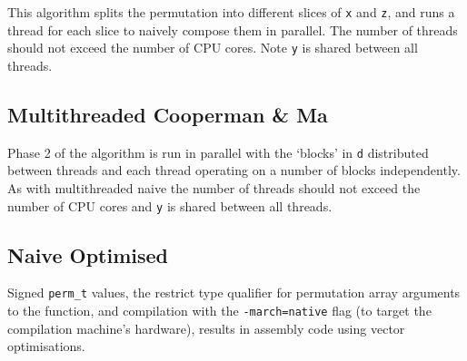 \documentclass{article}
\begin{document}

This algorithm splits the permutation into different slices of \texttt{x} and \texttt{z}, and runs a thread for each slice to naively compose them in parallel. The number of threads should not exceed the number of CPU cores. Note \texttt{y} is shared between all threads.

\subsection{Multithreaded Cooperman \& Ma}

Phase 2 of the algorithm is run in parallel with the `blocks' in \texttt{d} distributed between threads and each thread operating on a number of blocks independently. As with multithreaded naive the number of threads should not exceed the number of CPU cores and \texttt{y} is shared between all threads.

\subsection{Naive Optimised}

Signed \verb|perm_t| values, the restrict type qualifier for permutation array arguments to the function, and compilation with the \texttt{-march=native} flag (to target the compilation machine's hardware), results in assembly code using vector optimisations.


\end{document}

